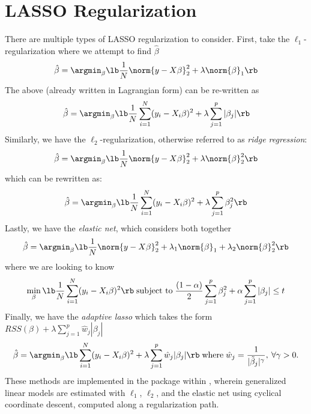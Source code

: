 \chapter{LASSO Regularization}
\label{app:E}
There are multiple types of LASSO regularization to consider. First, take the $\ell_1$-regularization where we attempt to find $\hat{\beta}$
\begin{equation}
    \hat{\beta} = \argmin_{\beta} \lb \frac{1}{N}\norm{y - X \beta}_2^2 + \lambda\norm{\beta}_1 \rb 
\end{equation}
The above (already written in Lagrangian form) can be re-written as 
\begin{equation}
    \hat{\beta} = \argmin_{\beta} \lb \frac{1}{N}\sum_{i=1}^N (y_i - X_i \beta)^2 + \lambda\sum_{j=1}^p |\beta_j| \rb 
\end{equation}
Similarly, we have the $\ell_2$-regularization, otherwise referred to as \textit{ridge regression}:
\begin{equation}
    \hat{\beta} = \argmin_{\beta} \lb \frac{1}{N}\norm{y - X \beta}_2^2 + \lambda\norm{\beta}_2^2 \rb 
\end{equation}
which can be rewritten as:
\begin{equation}
    \hat{\beta} = \argmin_{\beta} \lb \frac{1}{N}\sum_{i=1}^N (y_i - X_i \beta)^2 + \lambda\sum_{j=1}^p \beta_j^2 \rb 
\end{equation}
Lastly, we have the \textit{elastic net}, which considers both together
\begin{equation}
        \hat{\beta} = \argmin_{\beta} \lb \frac{1}{N}\norm{y - X \beta}_2^2 + \lambda_1\norm{\beta}_1 + \lambda_2\norm{\beta}_2^2 \rb 
\end{equation}
where we are looking to know
\begin{equation}
    \min_{\beta} \lb\frac{1}{N}\sum_{i=1}^N (y_i - X_i\beta)^2 \rb \; \text{subject to} \; \frac{(1-\alpha)}{2}\sum_{j=1}^p\beta_j^2 + \alpha\sum_{j=1}^p|\beta_j| \leq t
\end{equation}
Finally, we have the \textit{adaptive lasso} which takes the form $RSS(\beta) + \lambda\sum_{j=1}^p \hat{w}_j|\beta_j|$
\begin{equation}
    \hat{\beta} = \argmin_{\beta}\lb \sum_{i=1}^N (y_i - X_i\beta)^2 + \lambda\sum_{j=1}^p \hat{w}_j |\beta_j| \rb \; \text{where} \; \hat{w}_j = \frac{1}{|\tilde{\beta}_j|^{\gamma}}, \: \forall\gamma > 0.
\end{equation}
These methods are implemented in the  package within  \cite{friedman2010bregularization}, wherein generalized linear models are estimated with $\ell_1$, $\ell_2$, and the elastic net using cyclical coordinate descent, computed along a regularization path. 

